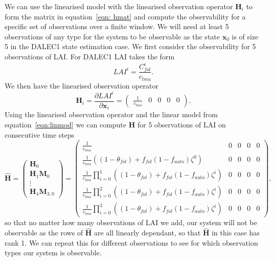 \documentclass[11pt]{article}
\begin{document}
We can use the linearised model with the linearised observation operator $\textbf{H}_{i}$ to form the matrix in equation~\eqref{eqn: hmat} and compute the observability for a specific set of observations over a finite window. We will need at least 5 observations of any type for the system to be observable as the state $\textbf{x}_0$ is of size 5 in the DALEC1 state estimation case. We first consider the observability for 5 observations of LAI. For DALEC1 LAI takes the form
\begin{equation}
LAI^{i} = \frac{C_{fol}^{i}}{c_{lma}}.
\end{equation}
We then have the linearised observation operator
\begin{equation}
\textbf{H}_{i} = \frac{\partial LAI^{i}}{\partial \textbf{x}_{i}} =
\begin{pmatrix}
\frac{1}{c_{lma}} & 0 & 0 & 0 & 0
\end{pmatrix}.
\end{equation}
Using the linearised observation operator and the linear model from equation~\eqref{eqn:linmod} we can compute $\hat{\textbf{H}}$ for 5 observations of LAI on consecutive time steps
\begin{dmath}
\hat{\mathbf{H}} =
\begin{pmatrix}
\mathbf{H}_0 \\
\mathbf{H}_1\mathbf{M}_0 \\
\vdots \\
\mathbf{H}_{4}\mathbf{M}_{3,0}

\end{pmatrix}
=
\begin{pmatrix}
\frac{1}{c_{lma}} & 0 & 0 & 0 & 0 \\
\frac{1}{c_{lma}}((1-\theta_{fol})+f_{fol}(1-f_{auto})\zeta^0) & 0 & 0 & 0 & 0 \\
\frac{1}{c_{lma}}\prod_{i=0}^{1}((1-\theta_{fol})+f_{fol}(1-f_{auto})\zeta^i) & 0 & 0 & 0 & 0 \\
\frac{1}{c_{lma}}\prod_{i=0}^{2}((1-\theta_{fol})+f_{fol}(1-f_{auto})\zeta^i) & 0 & 0 & 0 & 0 \\
\frac{1}{c_{lma}}\prod_{i=0}^{3}((1-\theta_{fol})+f_{fol}(1-f_{auto})\zeta^i) & 0 & 0 & 0 & 0
\end{pmatrix},
\end{dmath}
so that no matter how many observations of LAI we add, our system will not be observable as the rows of $\hat{\textbf{H}}$ are all linearly dependant, so that $\hat{\textbf{H}}$ in this case has rank 1. We can repeat this for different observations to see for which observation types our system is observable. 
\end{document}
